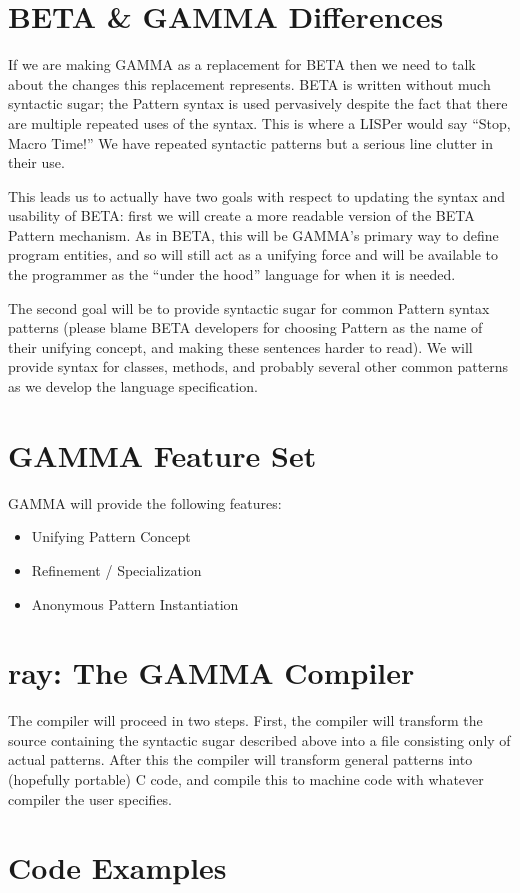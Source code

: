 \documentclass[10pt]{article}
\newcommand{\Lang}{GAMMA}
\newcommand{\Compiler}{ray}
\newcommand{\OLang}{BETA}
\begin{document}
\section*{\OLang{} \& \Lang{} Differences}
If we are making \Lang{} as a replacement for \OLang{} then we need to talk
about the changes this replacement represents. \OLang{} is written without
much syntactic sugar; the Pattern syntax is used pervasively despite the
fact that there are multiple repeated uses of the syntax. This is where a
LISPer would say ``Stop, Macro Time!'' We have repeated syntactic patterns
but a serious line clutter in their use.

This leads us to actually have two goals with respect to updating the syntax
and usability of \OLang{}: first we will create a more readable version of
the \OLang{} Pattern mechanism. As in \OLang, this will be \Lang{}'s primary
way to define program entities, and so will still act as a unifying force
and will be available to the programmer as the ``under the hood'' language
for when it is needed.

The second goal will be to provide syntactic sugar for common Pattern syntax
patterns (please blame \OLang{} developers for choosing Pattern as the name
of their unifying concept, and making these sentences harder to read). We will
provide syntax for classes, methods, and probably several other common patterns
as we develop the language specification.

\section*{\Lang{} Feature Set}

\Lang{} will provide the following features:

\begin{itemize}
\item Unifying Pattern Concept
\item Refinement / Specialization
\item Anonymous Pattern Instantiation
\end{itemize}

\section*{\Compiler{}: The \Lang{} Compiler}

The compiler will proceed in two steps. First, the compiler will transform
the source containing the syntactic sugar described above into a file
consisting only of actual patterns. After this the compiler will transform
general patterns into (hopefully portable) C code, and compile this to
machine code with whatever compiler the user specifies.

\section*{Code Examples}
\end{document}
